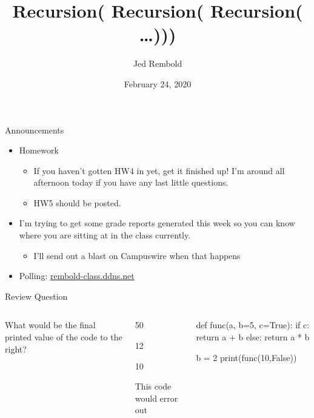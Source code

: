 \documentclass[pdf, aspectratio=169, 12pt]{beamer}
\title{Recursion( Recursion( Recursion( \ldots)))}
\author{Jed Rembold}
\date{February 24, 2020}
\begin{document}
\begin{frame}{Announcements}
	\begin{itemize}
		\item Homework
			\begin{itemize}
				\item If you haven't gotten HW4 in yet, get it finished up! I'm around all afternoon today if you have any last little questions.
				\item HW5 should be posted.
			\end{itemize}
		\item I'm trying to get some grade reports generated this week so you can know where you are sitting at in the class currently.
			\begin{itemize}
				\item I'll send out a blast on Campuswire when that happens
			\end{itemize}
		\item Polling: \url{rembold-class.ddns.net}
	\end{itemize}
\end{frame}

\begin{frame}[fragile]{Review Question}
	\begin{columns}
		What would be the final  printed value of the code to the right?
		\begin{poll}
		\item 50
		\item 12
		\item 10
		\item This code would error out
		\end{poll}

		\begin{pythoncode}
			def func(a, b=5, c=True):
				if c:
					return a + b
				else:
					return a * b

			b = 2
			print(func(10,False))
		\end{pythoncode}
	\end{columns}
\end{frame}
\end{document}
